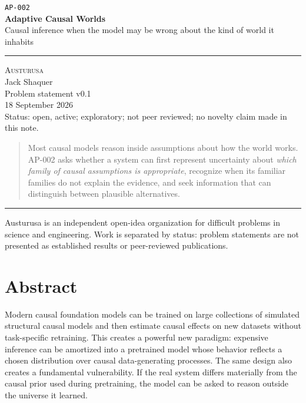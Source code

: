 \documentclass[11pt]{article}
\newcommand{\Austurusa}{\textsc{Austurusa}}
\begin{document}
\thispagestyle{empty}
\vspace*{0.7in}

{\large\texttt{AP-002}}\\[0.55em]
{\Huge\bfseries Adaptive Causal Worlds}\\[0.45em]
{\Large Causal inference when the model may be wrong about the kind of world it inhabits}

\vspace{1.2em}
\rule{\textwidth}{0.5pt}
\vspace{1.0em}

{\large\Austurusa}\\
Jack Shaquer\\
Problem statement v0.1\\
18 September 2026\\[0.5em]
{\color{muted}Status: open, active; exploratory; not peer reviewed; no novelty claim made in this note.}

\vfill

\begin{quote}
\large
Most causal models reason inside assumptions about how the world works. AP-002 asks whether a system can first represent uncertainty about \emph{which family of causal assumptions is appropriate}, recognize when its familiar families do not explain the evidence, and seek information that can distinguish between plausible alternatives.
\end{quote}

\vfill
\rule{\textwidth}{0.4pt}
{\small\color{muted}
Austurusa is an independent open-idea organization for difficult problems in science and engineering. Work is separated by status: problem statements are not presented as established results or peer-reviewed publications.
}
\newpage

\section*{Abstract}

Modern causal foundation models can be trained on large collections of simulated structural causal models and then estimate causal effects on new datasets without task-specific retraining. This creates a powerful new paradigm: expensive inference can be amortized into a pretrained model whose behavior reflects a chosen distribution over causal data-generating processes. The same design also creates a fundamental vulnerability. If the real system differs materially from the causal prior used during pretraining, the model can be asked to reason outside the universe it learned.
\end{document}
